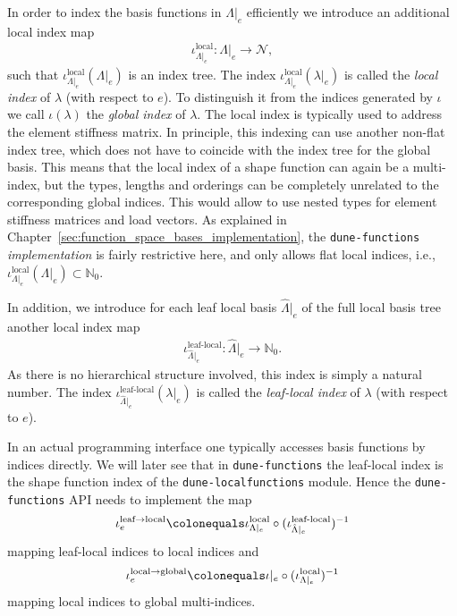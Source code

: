 \documentclass[a4paper,10pt,headings=normal,bibliography=totoc]{scrartcl}
\newcommand{\dunemodule}[1]{\texttt{#1}}
\begin{document}
In order to index the basis functions in $\Lambda|_e$ efficiently we introduce
an additional local index map
\begin{align*}
  \iota^{\text{local}}_{\Lambda|_e}: \Lambda|_e \to \mathcal{N},
\end{align*}
such that $\iota^{\text{local}}_{\Lambda|_e}(\Lambda|_e)$ is an index tree.
The index $\iota^{\text{local}}_{\Lambda|_e}(\lambda|_e)$ is
called the \emph{local index} of $\lambda$ (with respect to $e$).
To distinguish it from the indices generated by $\iota$
we call $\iota(\lambda)$ the \emph{global index} of $\lambda$.
The local index is typically used to address the element stiffness matrix.
In principle, this indexing can use another non-flat index tree,
which does not have to coincide with the index tree for the global basis.
This means that the local index of a shape function can again be a multi-index, but the types,
lengths and orderings can be completely unrelated to the corresponding global indices.
This would allow to use nested types for element stiffness matrices and load vectors.
As explained in Chapter~\ref{sec:function_space_bases_implementation},
the \dunemodule{dune-functions} \emph{implementation} is fairly restrictive here,
and only allows flat local indices, i.e.,
$\iota^{\text{local}}_{\Lambda|_e}(\Lambda|_e) \subset \mathbb{N}_0.$

In addition, we introduce for each leaf local basis $\hat{\Lambda}|_e$
of the full local basis tree another local index map
\begin{align*}
  \iota^{\text{leaf-local}}_{\hat{\Lambda}|_e}: \hat{\Lambda}|_e \to \mathbb{N}_0.
\end{align*}
As there is no hierarchical structure involved, this index is simply a
natural number.
The index $\iota^{\text{leaf-local}}_{\hat{\Lambda}|_e}(\lambda|_e)$ is
called the \emph{leaf-local index} of $\lambda$ (with respect to $e$).

In an actual programming interface one typically accesses
basis functions by indices directly. We will later see that
in \dunemodule{dune-functions} the leaf-local index is the
shape function index of the \dunemodule{dune-localfunctions} module.
Hence the \dunemodule{dune-functions} API needs to implement the map
\begin{align*}
  \iota^{\text{leaf}\to\text{local}}_e \colonequals \iota^{\text{local}}_{\Lambda|_e} \circ (\iota^{\text{leaf-local}}_{\hat{\Lambda}|_e})^{-1}
\end{align*}
mapping leaf-local indices to local indices and
\begin{align*}
  \iota^{\text{local}\to\text{global}}_e \colonequals \iota|_e \circ (\iota^{\text{local}}_{\Lambda|_e})^{-1}
\end{align*}
mapping local indices to global multi-indices.
\end{document}
